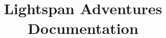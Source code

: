 \documentclass{report}
\begin{document}
\title{Lightspan Adventures Documentation}
\maketitle
\tableofcontents







\end{document}
